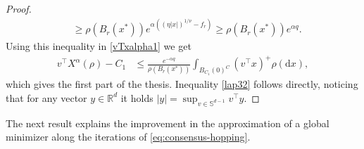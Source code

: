 \documentclass[reqno]{amsart}
\numberwithin{algorithm}{section}
\newcommand{\diff}{\mathrm{d}}
\newcommand{\R}{\mathbb{R}}
\newcommand{\Xalpha}{{X^\alpha}}
\begin{document}
{\begin{proof}
\begin{equation*}
\begin{aligned}
          &\geq \rho(B_r(x^*))e^{\alpha\left( (\eta|x|)^{1/\nu}-f_r\right)}\geq \rho(B_r(x^*)) e^{\alpha q}.
        \end{aligned}
    \end{equation*}
    Using this inequality in \eqref{vTxalpha1} we get 
     \begin{equation}\label{vTxalpha2}
    \begin{aligned}
        v^\top\Xalpha(\rho)-C_1
        &\leq \frac{e^{-\alpha q}}{\rho(B_r(x^*))}\int_{B_{C_1}(0)^C}  (v^\top x)^+\rho(\diff x),
    \end{aligned}
    \end{equation}
which gives the first part of the thesis. 
Inequality \eqref{lap32} follows directly, noticing that for any vector $y\in\R^d$ it holds 
$|y| = \sup_{v\in\mathbb S^{d-1}}v^\top y.$
    
\end{proof}

The next result explains the improvement in the approximation of a global minimizer along the iterations of \eqref{eq:consensus-hopping}.

}
\end{document}
